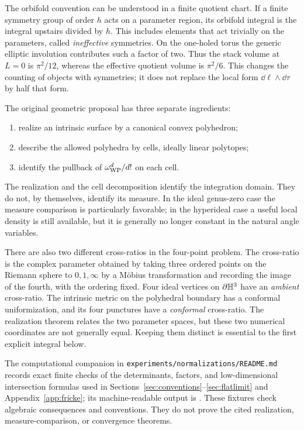 The orbifold convention can be understood in a finite quotient chart.
If a finite symmetry group of order $h$ acts on a parameter region,
its orbifold integral is the integral upstairs divided by $h$.
This includes elements that act trivially on the parameters, called
\emph{ineffective} symmetries. On the one-holed torus the generic
elliptic involution contributes such a factor of two. Thus the
stack volume at $L=0$ is $\pi^2/12$, whereas the effective quotient
volume is $\pi^2/6$. This changes the counting of objects with
symmetries; it does not replace the local form $\dd\ell\wedge\dd\tau$
by half that form.

The original geometric proposal has three separate ingredients:
\begin{enumerate}
 \item realize an intrinsic surface by a canonical convex polyhedron;
 \item describe the allowed polyhedra by cells, ideally linear polytopes;
 \item identify the pullback of $\omega_{\mathrm{WP}}^{d}/d!$ on each cell.
\end{enumerate}
The realization and the cell decomposition identify the integration domain.
They do not, by themselves, identify its measure. In the ideal genus-zero
case the measure comparison is particularly favorable; in the hyperideal
case a useful local density is still available, but it is generally no longer
constant in the natural angle variables.

There are also two different cross-ratios in the four-point problem.
The cross-ratio is the complex parameter obtained by taking three
ordered points on the Riemann sphere to $0,1,\infty$ by a M\"obius
transformation and recording the image of the fourth, with the
ordering fixed. Four
ideal vertices on $\partial\mathbb H^3$ have an \emph{ambient} cross-ratio. The
intrinsic metric on the polyhedral boundary has a conformal uniformization,
and its four punctures have a \emph{conformal} cross-ratio. The realization
theorem relates the two parameter spaces, but these two numerical coordinates
are not generally equal. Keeping them distinct is essential to the first
explicit integral below.

The computational companion in
\texttt{experiments/normalizations/README.md} records exact finite checks
of the determinants, factors, and low-dimensional intersection formulas
used in Sections~\ref{sec:conventions}--\ref{sec:flatlimit} and
Appendix~\ref{app:fricke}; its machine-readable output is
. These fixtures check
algebraic consequences and conventions. They do not prove the cited
realization, measure-comparison, or convergence theorems.

